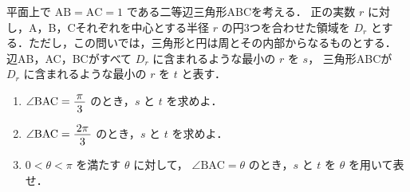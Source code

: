 ﻿\documentclass[../../../uem_tok_q.tex]{subfiles}
\begin{document}
    平面上で $\mathrm{AB}=\mathrm{AC}=1$ である二等辺三角形ABCを考える．%
    正の実数 $r$ に対し，A，B，Cそれぞれを中心とする半径 $r$ の円3つを合わせた領域を %
    $D_r$ とする．ただし，この問いでは，三角形と円は周とその内部からなるものとする．%
    辺AB，AC，BCがすべて $D_r$ に含まれるような最小の $r$ を $s$，%
    三角形ABCが $D_r$ に含まれるような最小の $r$ を $t$ と表す．

    \begin{enumerate}
        \item $\angle\mathrm{BAC}=\myfraca{\pi}{3}$ のとき，$s$ と $t$ を求めよ．
        \item $\angle\mathrm{BAC}=\myfraca{2\pi}{3}$ のとき，$s$ と $t$ を求めよ．
        \item $0<\theta<\pi$ を満たす $\theta$ に対して，%
        $\angle\mathrm{BAC}=\theta$ のとき，$s$ と $t$ を $\theta$ を用いて表せ．
    \end{enumerate}
\end{document}
